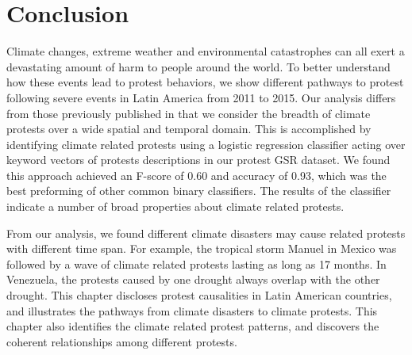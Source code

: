 \section{Conclusion}
Climate changes, extreme weather and environmental catastrophes can all exert a devastating amount of harm to people around the world.
To better understand how these events lead to protest behaviors, we show different pathways to protest following severe events in Latin America from 2011 to 2015.
Our analysis differs from those previously published in that we consider the breadth of climate protests over a wide spatial and temporal domain.
This is accomplished by identifying climate related protests using a logistic regression classifier acting over keyword vectors of protests descriptions in our protest GSR dataset.
We found this approach achieved an F-score of 0.60 and accuracy of 0.93, which was the best preforming of other common binary classifiers.
The results of the classifier indicate a number of broad properties about climate related protests.

From our analysis, we found different climate disasters may cause related protests with different time span.
For example, the tropical storm Manuel in Mexico was followed by a wave of climate related protests lasting as long as 17 months.
In Venezuela, the protests caused by one drought always overlap with the other drought. This chapter discloses protest causalities in Latin American countries, and illustrates the pathways from climate disasters to climate protests. This chapter also identifies the climate related protest patterns, and discovers the coherent relationships among different protests.




%


